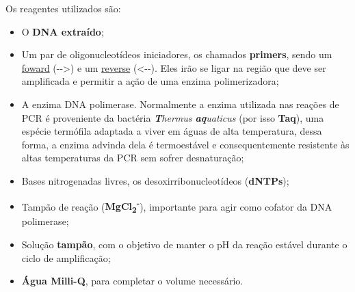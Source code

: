 \documentclass[
  letterpaper,
  DIV=11,
  numbers=noendperiod]{scrreprt}
\begin{document}
\begin{tcolorbox}[enhanced jigsaw, colbacktitle=quarto-callout-tip-color!10!white, toprule=.15mm, rightrule=.15mm, opacityback=0, left=2mm, arc=.35mm, breakable, colback=white, bottomtitle=1mm, opacitybacktitle=0.6, toptitle=1mm, leftrule=.75mm, coltitle=black, titlerule=0mm, bottomrule=.15mm, title=\textcolor{quarto-callout-tip-color}{\faLightbulb}\hspace{0.5em}{Aprendendo}]

Os reagentes utilizados são:

\begin{itemize}
\item
  O \textbf{DNA extraído};
\item
  Um par de oligonucleotídeos iniciadores, os chamados \textbf{primers},
  sendo um \ul{foward} (-\/-\textgreater) e um \ul{reverse}
  (\textless-\/-). Eles irão se ligar na região que deve ser amplificada
  e permitir a ação de uma enzima polimerizadora;
\item
  A enzima DNA polimerase. Normalmente a enzima utilizada nas reações de
  PCR é proveniente da bactéria \emph{\textbf{T}hermus
  \textbf{aq}uaticus} (por isso \textbf{Taq}), uma espécie termófila
  adaptada a viver em águas de alta temperatura, dessa forma, a enzima
  advinda dela é termoestável e consequentemente resistente às altas
  temperaturas da PCR sem sofrer desnaturação;
\item
  Bases nitrogenadas livres, os desoxirribonucleotídeos
  (\textbf{dNTPs});
\item
  Tampão de reação (\textbf{MgCl\textsubscript{2}\textsuperscript{-}}),
  importante para agir como cofator da DNA polimerase;
\item
  Solução \textbf{tampão}, com o objetivo de manter o pH da reação
  estável durante o ciclo de amplificação;
\item
  \textbf{Água Milli-Q}, para completar o volume necessário.
\end{itemize}

\end{tcolorbox}
\end{document}
